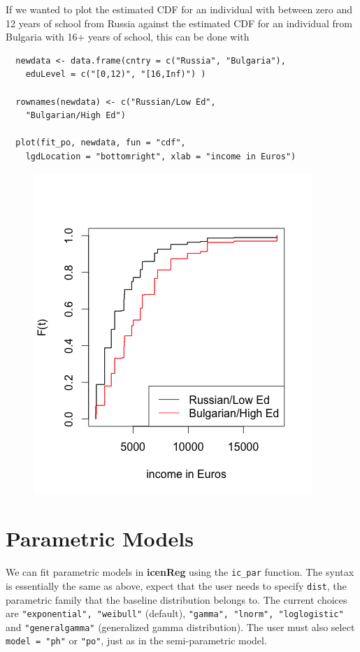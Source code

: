 \documentclass[11pt]{report}
\begin{document}
  If we wanted to plot the estimated CDF  
  for an individual with between
  zero and 12 years of school from Russia against the estimated CDF for an
  individual from Bulgaria with 16+ years of school, this can be done with 
  
  \begin{verbatim}
  newdata <- data.frame(cntry = c("Russia", "Bulgaria"),
    eduLevel = c("[0,12)", "[16,Inf)") )
    
  rownames(newdata) <- c("Russian/Low Ed", 
    "Bulgarian/High Ed")

  plot(fit_po, newdata, fun = "cdf", 
    lgdLocation = "bottomright", xlab = "income in Euros")
  \end{verbatim}
  
  \begin{figure}
  \includegraphics{essIncCDF.png}
  \label{figure:RusvBulg}
  \end{figure}
  
  \section{Parametric Models}
  
  We can fit parametric models in {\bf icenReg} using the \texttt{ic\_par} function. 
  The syntax is essentially the same as above, expect that the user needs to specify
  \texttt{dist}, the parametric family that the baseline distribution belongs to. 
  The current choices are \texttt{"exponential", "weibull"} (default), 
  \texttt{"gamma", "lnorm", "loglogistic"} and \texttt{"generalgamma"} (generalized 
  gamma distribution). The user must also select \texttt{model = "ph"} or \texttt{"po"}, 
  just as in the semi-parametric model. 
  
\end{document}
